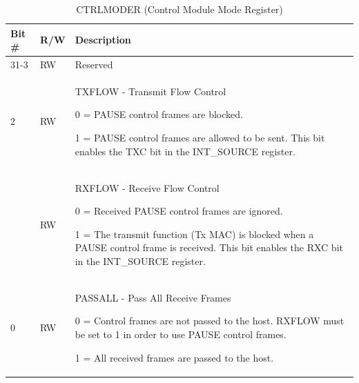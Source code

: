 \begin{xltabular}{\textwidth}{|l|l|X|}
  
  \hline
  {\bf Bit \#} & {\bf R/W} & {\bf Description} \\ \hline \hline
  \endfirsthead
  \hline
  \caption{CTRLMODER (Control Module Mode Register)}
  \endlastfoot

  31-3   & RW  & Reserved \\* \nobreakhline
  2  & RW  & TXFLOW - Transmit Flow Control

              0 = PAUSE control frames are blocked. 

              1 = PAUSE control frames are allowed to be sent. This bit
              enables the TXC bit in the INT\_SOURCE register.\\*   & RW  & RXFLOW - Receive Flow Control

              0 = Received PAUSE control frames are ignored.

              1 = The transmit function (Tx MAC) is blocked when a PAUSE
              control frame is received. This bit enables the RXC bit in the
              INT\_SOURCE register.\\* \nobreakhline
  0  & RW  & PASSALL - Pass All Receive Frames

              0 = Control frames are not passed to the host. RXFLOW must be
              set to 1 in order to use PAUSE control frames.

              1 = All received frames are passed to the host.\\ \hline
\end{xltabular}
\label{csr_details:ctrlmoder}

